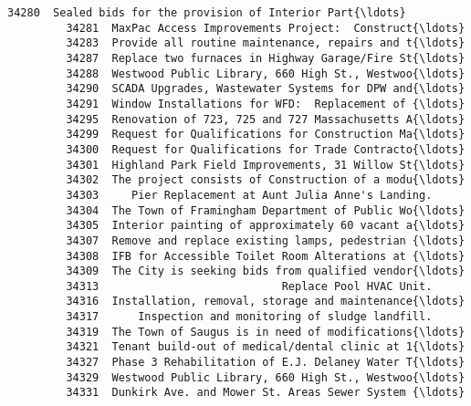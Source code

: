 \documentclass[11pt]{article}
\begin{document}
\begin{Verbatim}[commandchars=\\\{\}]
         34280  Sealed bids for the provision of Interior Part{\ldots}   
         34281  MaxPac Access Improvements Project:  Construct{\ldots}   
         34283  Provide all routine maintenance, repairs and t{\ldots}   
         34287  Replace two furnaces in Highway Garage/Fire St{\ldots}   
         34288  Westwood Public Library, 660 High St., Westwoo{\ldots}   
         34290  SCADA Upgrades, Wastewater Systems for DPW and{\ldots}   
         34291  Window Installations for WFD:  Replacement of {\ldots}   
         34295  Renovation of 723, 725 and 727 Massachusetts A{\ldots}   
         34299  Request for Qualifications for Construction Ma{\ldots}   
         34300  Request for Qualifications for Trade Contracto{\ldots}   
         34301  Highland Park Field Improvements, 31 Willow St{\ldots}   
         34302  The project consists of Construction of a modu{\ldots}   
         34303     Pier Replacement at Aunt Julia Anne's Landing.   
         34304  The Town of Framingham Department of Public Wo{\ldots}   
         34305  Interior painting of approximately 60 vacant a{\ldots}   
         34307  Remove and replace existing lamps, pedestrian {\ldots}   
         34308  IFB for Accessible Toilet Room Alterations at {\ldots}   
         34309  The City is seeking bids from qualified vendor{\ldots}   
         34313                            Replace Pool HVAC Unit.   
         34316  Installation, removal, storage and maintenance{\ldots}   
         34317      Inspection and monitoring of sludge landfill.   
         34319  The Town of Saugus is in need of modifications{\ldots}   
         34321  Tenant build-out of medical/dental clinic at 1{\ldots}   
         34327  Phase 3 Rehabilitation of E.J. Delaney Water T{\ldots}   
         34329  Westwood Public Library, 660 High St., Westwoo{\ldots}   
         34331  Dunkirk Ave. and Mower St. Areas Sewer System {\ldots}   
         

\end{Verbatim}
\end{document}
